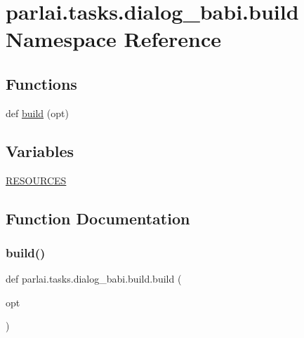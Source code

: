 \hypertarget{namespaceparlai_1_1tasks_1_1dialog__babi_1_1build}{}\section{parlai.\+tasks.\+dialog\+\_\+babi.\+build Namespace Reference}
\label{namespaceparlai_1_1tasks_1_1dialog__babi_1_1build}
\subsection*{Functions}
\begin{DoxyCompactItemize}
\item 
def \hyperlink{namespaceparlai_1_1tasks_1_1dialog__babi_1_1build_a27e45864cbef49db5548fccd56a918dd}{build} (opt)
\end{DoxyCompactItemize}
\subsection*{Variables}
\begin{DoxyCompactItemize}
\item 
\hyperlink{namespaceparlai_1_1tasks_1_1dialog__babi_1_1build_a7fee8f082ba55d5b306e8e367ee211ac}{R\+E\+S\+O\+U\+R\+C\+ES}
\end{DoxyCompactItemize}


\subsection{Function Documentation}
\mbox{\label{namespaceparlai_1_1tasks_1_1dialog__babi_1_1build_a27e45864cbef49db5548fccd56a918dd}} 
\subsubsection{\texorpdfstring{build()}{build()}}
{\footnotesize\ttfamily def parlai.\+tasks.\+dialog\+\_\+babi.\+build.\+build (\begin{DoxyParamCaption}\item[{}]{opt }\end{DoxyParamCaption})}



